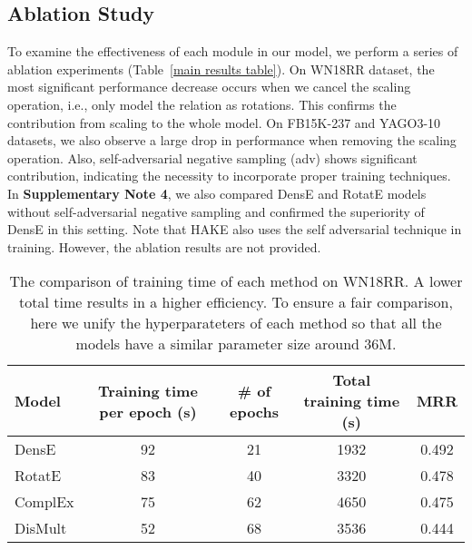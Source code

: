 \documentclass[11pt]{article}
\begin{document}
\subsection{Ablation Study} To examine the effectiveness of each module in our model, we perform a series of ablation experiments (Table~\ref{main results table}). On WN18RR dataset, the most significant performance decrease occurs when we cancel the scaling operation, i.e., only model the relation as rotations. This confirms the contribution from scaling to the whole model. On FB15K-237 and YAGO3-10 datasets, we also observe a large drop in performance when removing the scaling operation. Also, self-adversarial negative sampling (adv) shows significant contribution, indicating the necessity to incorporate proper training techniques. In \textbf{Supplementary Note 4}, we also compared DensE and RotatE models without self-adversarial negative sampling and confirmed the superiority of DensE in this setting. Note that HAKE also uses the self adversarial technique in training. However, the ablation results are not provided.



\begin{table*}[h!]
\centering
\caption{The comparison of training time of each method on WN18RR. A lower total time results in a higher efficiency. To ensure a fair comparison, here we unify the hyperparateters of each method so that all the models have a similar parameter size around 36M.}

\begin{tabular}{ l c c c c }
 \toprule
 Model  & Training time per epoch (s) & \# of epochs & Total training time (s) & MRR  \\  
 \midrule
 DensE & 92 & 21 & 1932 & 0.492 \\
 RotatE & 83 & 40 & 3320 & 0.478 \\
 ComplEx & 75 & 62 & 4650 & 0.475 \\
 DisMult & 52 & 68 & 3536 & 0.444 \\
\bottomrule
\end{tabular} 
\label{time}
\end{table*}
\end{document}
